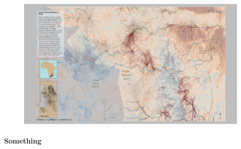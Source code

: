 \documentclass[b5paper]{scrbook}
\begin{document}
	
	\tableofcontents
	\pagestyle{plain}
	
	\begin{figure}
		\includegraphics[width=1.2\textwidth,align=cb]{../figures/boxes/elemove.png}
		\label{fig:LandscapeFigure}
	\end{figure}
	
	\begin{addmargin}[-1cm]{-2cm}
		\colorbox{Snow2}{
			\begin{minipage}[t]{\linewidth}%
				
				\paragraph{Something}
				\lipsum[1]
			\end{minipage}
		}	
	\end{addmargin}
\end{document}
